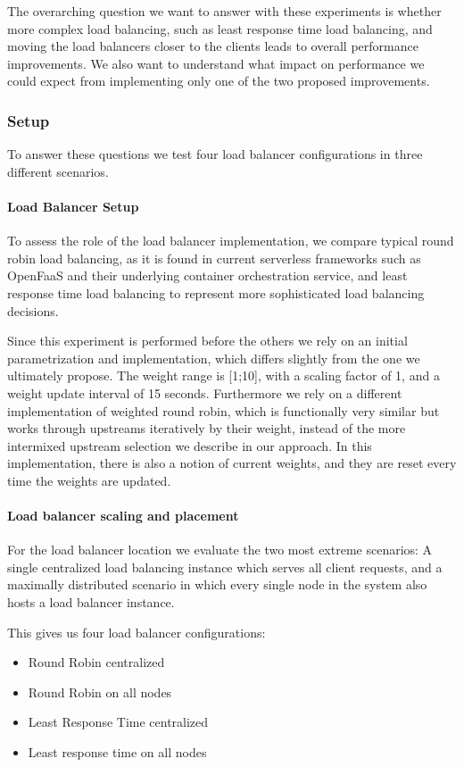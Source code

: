 \documentclass[draft,final]{vutinfth} %
\begin{document}
The overarching question we want to answer with these experiments is whether more complex load balancing, such as least response time load balancing, and moving the load balancers closer to the clients leads to overall performance improvements.
We also want to understand what impact on performance we could expect from implementing only one of the two proposed improvements.

\subsubsection{Setup}
To answer these questions we test four load balancer configurations in three different scenarios.
\paragraph{Load Balancer Setup}
To assess the role of the load balancer implementation, we compare typical round robin load balancing, as it is found in current serverless frameworks such as OpenFaaS\cite{openfaas} and their underlying container orchestration service\cite{kubernetes}, and least response time load balancing to represent more sophisticated load balancing decisions.

Since this experiment is performed before the others we rely on an initial parametrization and implementation, which differs slightly from the one we ultimately propose.
The weight range is [1;10], with a scaling factor of 1, and a weight update interval of 15 seconds.
Furthermore we rely on a different implementation of weighted round robin\cite{wrr-kblinux}, which is functionally very similar but works through upstreams iteratively by their weight, instead of the more intermixed upstream selection we describe in our approach.
In this implementation, there is also a notion of current weights\cite{wrr-kblinux}, and they are reset every time the weights are updated.
\paragraph{Load balancer scaling and placement}
For the load balancer location we evaluate the two most extreme scenarios: A single centralized load balancing instance which serves all client requests, and a maximally distributed scenario in which every single node in the system also hosts a load balancer instance.

This gives us four load balancer configurations:
\begin{itemize}
    \item Round Robin centralized
    \item Round Robin on all nodes
    \item Least Response Time centralized
    \item Least response time on all nodes
\end{itemize}
\end{document}
